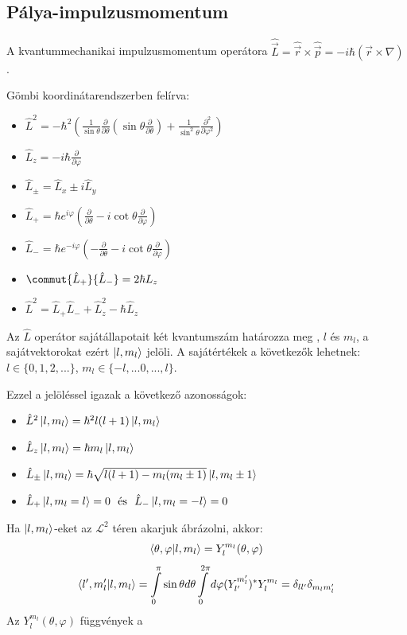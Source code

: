 \subsection{Pálya-impulzusmomentum}
A kvantummechanikai impulzusmomentum operátora $\hat{\vec L} = \hat{\vec r} \times \hat{\vec p} = -i \hbar (\vec r \times \nabla)$.

Gömbi koordinátarendszerben felírva:
\begin{itemize}
    \item $
        \hat L^2 = -\hbar^2 \left(\frac{1}{\sin \theta} \frac{\partial}{\partial \theta} \left(\sin\theta\frac{\partial}{\partial \theta}\right) 
        + \frac{1}{\sin^2 \theta}\frac{\partial^2}{\partial\varphi^2}\right)
    $
    \item $
        \hat L_z = -i\hbar \frac{\partial}{\partial\varphi}
    $
    \item $
      \hat L_{\pm} = \hat L_x \pm i \hat L_y
    $
    \item $
        \hat L_+ = \hbar e^{i\varphi} \left( \frac{\partial}{\partial \theta} - i \cot\theta \frac{\partial}{\partial \varphi}\right)
    $
    \item $
        \hat L_- = \hbar e^{-i\varphi} \left( - \frac{\partial}{\partial \theta} - i \cot\theta \frac{\partial}{\partial \varphi}\right)
    $
    \item $
        \commut{\hat L_+}{\hat L_-} = 2 \hbar L_z
    $
    \item $
        \hat L^2 = \hat L_+ \hat L_- + \hat L_z^2 - \hbar \hat L_z
    $
\end{itemize}
Az $\hat L$ operátor sajátállapotait két kvantumszám határozza meg , $l$ és $m_l$, a sajátvektorokat ezért $\ket{l,m_l}$ jelöli.
A sajátértékek a következők lehetnek: $l\in \{0,1,2, ...\}$, $m_l \in \{-l,... 0, ..., l\}$.

Ezzel a jelöléssel igazak a következő azonosságok:
\begin{itemize}
    \item $
        \hat L^2 \ket{l, m_l} = \hbar^2 l (l+1) \ket{l,m_l}
    $
    \item $
        \hat L_z \ket{l, m_l} = \hbar m_l \ket{l,m_l}
    $
    \item $
      \hat L_{\pm}\ket{l, m_l} = \hbar \sqrt{l(l+1) - m_l(m_l\pm1)}\ket{l,m_l\pm 1}
    $
    \item $
        \hat L_+ \ket{l,m_l=l} = 0 ~~ \textrm{és} ~~ \hat L_- \ket{l,m_l=-l} = 0
    $
\end{itemize}
Ha $\ket{l,m_l}$-eket az $\mathcal{L}^2$ téren akarjuk ábrázolni, akkor:
\begin{equation}
    \braket{\theta, \varphi | l,m_l} = Y^{m_l}_l(\theta, \varphi)
\end{equation}
\begin{equation}
   \braket{l',m'_l|l,m_l} = \int \limits_0^{\pi}\sin\theta d \theta \int \limits_0^{2\pi}d \varphi (Y^{m_l'}_{l'})^{*} Y^{m_l}_l = \delta_{ll'}\delta_{m_lm_l'}
\end{equation}
Az $Y^{m_l}_l(\theta, \varphi)$ függvények a 

